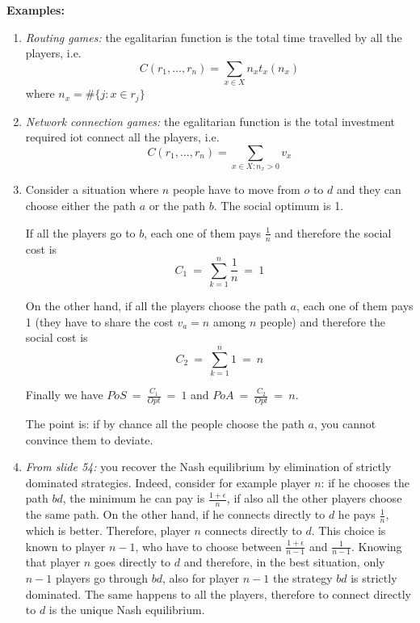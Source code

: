 \bigskip
\noindent \textbf{Examples:}
\begin{enumerate}
	\item \textit{Routing games:} the egalitarian function is the total time travelled by all the players, i.e.
	\[
		C(r_1,...,r_n) = \sum_{x \in X}{n_xt_x(n_x)}
	\]
	where $n_x = \#\{j: x \in r_j\}$
	
	\item \textit{Network connection games:} the egalitarian function is the total investment required iot connect all the players, i.e.
	\[
		C(r_1,...,r_n) = \sum_{x \in X: n_x > 0}{v_x}
	\]

	\item Consider a situation where $n$ people have to move from $o$ to $d$ and they can choose either 
	the path $a$ or the path $b$. The social optimum is 1. 
	
	\noindent If all the players go to $b$, each one of them pays $\frac{1}{n}$ 
	and therefore the social cost is
	\[
		C_1~=~\sum_{k=1}^n{\frac{1}{n}}~=~1
	\]
	
	\noindent On the other hand, if all the players choose the path $a$, each one 
	of them pays 1 (they have to share the cost $v_a=n$ among $n$ people) and 
	therefore the social cost is 
	\[
		C_2~=~\sum_{k=1}^n{1}~=~n
	\]
	
	\noindent Finally we have $PoS~=~\frac{C_1}{Opt}~=~1$ and 
	$PoA~=~\frac{C_2}{Opt}~=~n$.
	
	\noindent The point is: if by chance all the people choose the path $a$, you 
	cannot convince them to deviate.
	
	\item \textit{From slide 54:} you recover the Nash equilibrium by elimination of strictly dominated 
	strategies. Indeed, consider for example player $n$: if he chooses the path 
	$bd$, the minimum he can pay is $\frac{1+\epsilon}{n}$, if also all the other 
	players choose the same path. On the other hand, if he connects directly to 
	$d$ he pays $\frac{1}{n}$, which is better. Therefore, player $n$ connects 
	directly to $d$. This choice is known to player $n-1$, who have to choose 
	between $\frac{1+\epsilon}{n-1}$ and $\frac{1}{n-1}$. Knowing that player $n$ 
	goes directly to $d$ and therefore, in the best situation, only $n-1$ players 
	go through $bd$, also for player $n-1$ the strategy $bd$ is strictly 
	dominated. The same happens to all the players, therefore to connect directly 
	to $d$ is the unique Nash equilibrium.
\end{enumerate}

